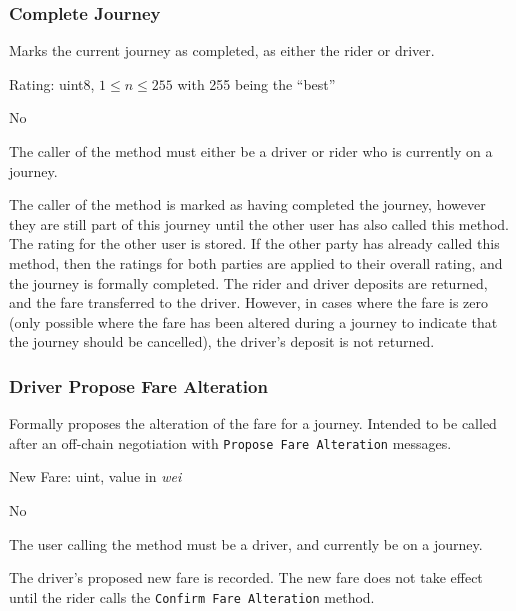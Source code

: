 \subsubsection{Complete Journey}

\begin{description}[leftmargin=8em,style=nextline]
	\item [Description]
		Marks the current journey as completed, as either the rider or driver.
	\item [Arguments]
		Rating: uint8, $1 \leq n \leq 255$ with 255 being the \enquote{best}
	\item [Payable] No
	\item [Preconditions]
		The caller of the method must either be a driver or rider who is currently on a journey.
	\item [Postconditions]
		The caller of the method is marked as having completed the journey, however they are still part of this journey until the other user has also called this method. The rating for the other user is stored. If the other party has already called this method, then the ratings for both parties are applied to their overall rating, and the journey is formally completed. The rider and driver deposits are returned, and the fare transferred to the driver. However, in cases where the fare is zero (only possible where the fare has been altered during a journey to indicate that the journey should be cancelled), the driver's deposit is not returned.
\end{description}

\subsubsection{Driver Propose Fare Alteration}

\begin{description}[leftmargin=8em,style=nextline]
	\item [Description]
		Formally proposes the alteration of the fare for a journey. Intended to be called after an off-chain negotiation with \lstinline{Propose Fare Alteration} messages.
	\item [Arguments]
		New Fare: uint, value in \textit{wei}
	\item [Payable]
		No
	\item [Preconditions]
		The user calling the method must be a driver, and currently be on a journey.
	\item [Postconditions]
		The driver's proposed new fare is recorded. The new fare does not take effect until the rider calls the \lstinline{Confirm Fare Alteration} method.
\end{description}

